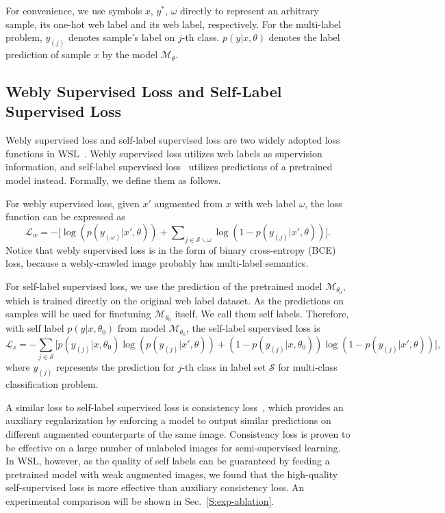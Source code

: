 \documentclass[runningheads]{llncs}
\begin{document}
For convenience, we use symbols $x$, $y^*$, $\omega$ directly to represent an arbitrary sample, its one-hot web label and its web label, respectively. For the multi-label problem, $y_{(j)}$ denotes sample's label on $j$-th class.
$p(y|x,\theta)$ denotes the label prediction of sample $x$ by the model $\mathcal{M}_\theta$.
	
\subsection{Webly Supervised Loss and Self-Label Supervised Loss}
\label{S:method-loss}
Webly supervised loss and self-label supervised loss are two widely adopted loss functions in WSL~\cite{guo2018curriculumnet,han2019deep,reed2014bootstrap,tanaka2018joint}. 
Webly supervised loss utilizes web labels as supervision information, and self-label supervised loss~\cite{han2019deep,tanaka2018joint} utilizes predictions of a pretrained model instead. Formally, we define them as follows.

For webly supervised loss, given $x'$ augmented from $x$ with web label $\omega$, the loss function can be expressed as
\begin{equation}
\label{eq:loss_w}
	\mathcal{L}_w=-\biggl[\log\left(p(y_{(\omega)}|x',\theta)\right)
	+\sum\nolimits_{j\in\mathcal{S}\backslash\omega}\log\left(1-p(y_{(j)}|x',\theta)\right)\biggl].
\end{equation}
Notice that webly supervised loss is in the form of binary cross-entropy (BCE) loss, because a webly-crawled image probably has multi-label semantics.

For self-label supervised loss, we use the prediction of the pretrained model $\mathcal{M}_{\theta_0}$, which is trained directly on the original web label dataset. As the predictions on samples will be used for finetuning $\mathcal{M}_{\theta_0}$ itself, We call them self labels.  Therefore, with self label $p(y|x,\theta_0)$ from model $\mathcal{M}_{\theta_0}$, the self-label supervised loss is 
\begin{equation}
\mathcal{L}_s = -\sum_{j\in\mathcal{S}}
\biggl[p(y_{(j)}|x,\theta_0)\log\left(p(y_{(j)}|x',\theta)\right) 
+ \left(1-p(y_{(j)}|x,\theta_0)\right)\log\left(1-p(y_{(j)}|x',\theta)\right)
\biggl],
\end{equation}
where $y_{(j)}$ represents the prediction for $j$-th class in label set $\mathcal{S}$ for multi-class classification problem.

A similar loss to self-label supervised loss is consistency loss~\cite{berthelot2019mixmatch,xie2019unsupervised}, which provides an auxiliary regularization by enforcing a model to output similar predictions on different augmented counterparts of the same image. Consistency loss is proven to be effective on a large number of unlabeled images for semi-supervised learning. In WSL, however, as the quality of self labels can be guaranteed by feeding a pretrained model with weak augmented images, we found that the high-quality self-supervised loss is more effective than auxiliary consistency loss. An experimental comparison will be shown in Sec.~\ref{S:exp-ablation}.
\end{document}
